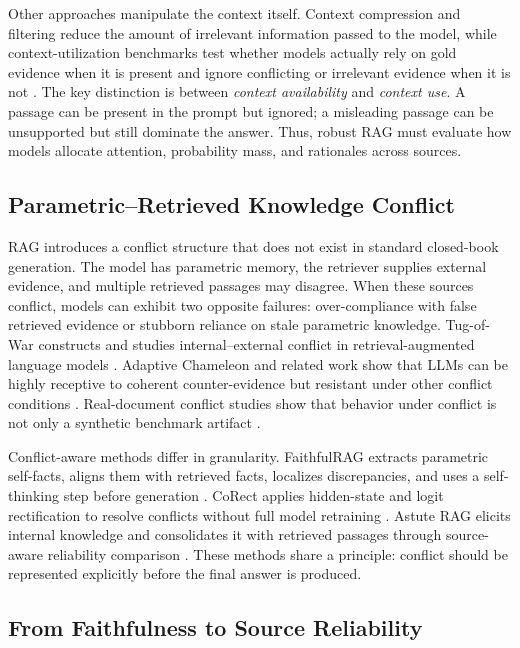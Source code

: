 \documentclass[11pt]{article}
\begin{document}
Other approaches manipulate the context itself. Context compression and filtering reduce the amount of irrelevant information passed to the model, while context-utilization benchmarks test whether models actually rely on gold evidence when it is present and ignore conflicting or irrelevant evidence when it is not \citep{rrag032}. The key distinction is between \emph{context availability} and \emph{context use}. A passage can be present in the prompt but ignored; a misleading passage can be unsupported but still dominate the answer. Thus, robust RAG must evaluate how models allocate attention, probability mass, and rationales across sources.

\subsection{Parametric--Retrieved Knowledge Conflict}

RAG introduces a conflict structure that does not exist in standard closed-book generation. The model has parametric memory, the retriever supplies external evidence, and multiple retrieved passages may disagree. When these sources conflict, models can exhibit two opposite failures: over-compliance with false retrieved evidence or stubborn reliance on stale parametric knowledge. Tug-of-War constructs and studies internal--external conflict in retrieval-augmented language models \citep{tugOfWar2024}. Adaptive Chameleon and related work show that LLMs can be highly receptive to coherent counter-evidence but resistant under other conflict conditions \citep{rrag046}. Real-document conflict studies show that behavior under conflict is not only a synthetic benchmark artifact \citep{rrag112}.

Conflict-aware methods differ in granularity. FaithfulRAG extracts parametric self-facts, aligns them with retrieved facts, localizes discrepancies, and uses a self-thinking step before generation \citep{faithfulRAG2025}. CoRect applies hidden-state and logit rectification to resolve conflicts without full model retraining \citep{rrag008}. Astute RAG elicits internal knowledge and consolidates it with retrieved passages through source-aware reliability comparison \citep{astuteRAG2025}. These methods share a principle: conflict should be represented explicitly before the final answer is produced.

\subsection{From Faithfulness to Source Reliability}
\end{document}
